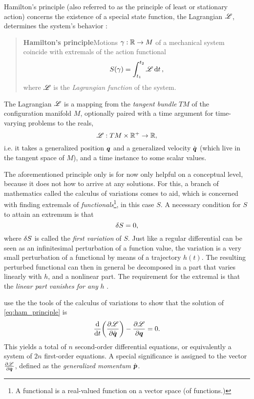 Hamilton's principle (also referred to as the principle of least or stationary action) concerns the existence of a special state function, the Lagrangian $\mathscr{L}$, determines the system's behavior \cite{Arnold1989}:
\begin{quote}
    \textbf{Hamilton's principle}\qquad Motions $\gamma: 
    \mathbb{R} \to M$ of a mechanical system coincide with extremals of the action functional
    \begin{equation}
        S(\gamma) = \int_{t_1}^{t_2} \mathscr{L} \dd{t},
        \label{eq:ham_principle}
    \end{equation}
    where $\mathscr{L}$ is the \emph{Lagrangian function} of the system.
\end{quote}
The Lagrangian \(\mathscr{L}\) is a mapping from the \emph{tangent bundle} \(TM\) of the configuration manifold \(M\), optionally paired with a time argument for time-varying problems to the reals,
    \[ \mathscr{L} : TM \times \mathbb{R}^+ \to \mathbb{R}, \]
i.e. it takes a generalized position \(\vb*{q}\) and a generalized velocity \(\dot{\vb*{q}}\) (which live in the tangent space of \(M\)), and a time instance to some scalar values.

The aforementioned principle only is for now only helpful on a conceptual level, because it does not how to arrive at any solutions. For this, a branch of mathematics called the calculus of variations comes to aid, which is concerned with finding extremals of \emph{functionals}\footnote{A functional is a real-valued function on a vector space (of functions.)}, in this case \(S\). A necessary condition for \(S\) to attain an extremum is that 
\[ \var{S} = 0,\]
where \(\var{S}\) is called the \emph{first variation} of \(S\). Just like a regular differential can be seen as an infinitesimal perturbation of a function value, the variation is a very small perturbation of a functional by means of a trajectory \(h(t)\). The resulting perturbed functional can then in general be decomposed in a part that varies linearly with \(h\), and a nonlinear part. The requirement for the extremal is that the \emph{linear part vanishes for any} \(h\) \cite{Arnold1989}.

\citet{Landau1976} use the the tools of the calculus of variations to show that the solution of \cref{eq:ham_principle} is
\[ \dv{}{t}\qty(\pdv{\ensuremath{\mathscr{L}}}{\ensuremath{\dot{\vb*{q}}}}) - \pdv{\ensuremath{\mathscr{L}}}{\ensuremath{\vb*{q}}} = 0. \]
This yields a total of \(n\) second-order differential equations, or equivalently a system of \(2n\) first-order equations. A special significance is assigned to the vector $\pdv{\ensuremath{\mathscr{L}}}{\ensuremath{\dot{\vb*{q}}}}$, defined as the \emph{generalized momentum} $\dot{\vb*{p}}$.

